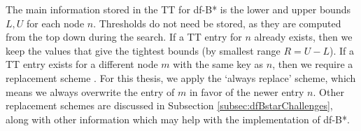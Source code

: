 The main information stored in the TT for df-B* is the lower and upper bounds $L,U$ for each node $n$. Thresholds do not need be stored, as they are computed from the top down during the search. If a TT entry for $n$ already exists, then we keep the values that give the tightest bounds (by smallest range $R=U-L$). If a TT entry exists for a different node $m$ with the same key as $n$, then we require a replacement scheme \cite{Nagai2002}. For this thesis, we apply the `always replace' scheme, which means we always overwrite the entry of $m$ in favor of the newer entry $n$.
Other replacement schemes are discussed in Subsection \ref{subsec:dfBstarChallenges}, along with other information which may help with the implementation of df-B*.

